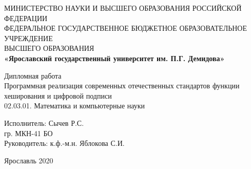 \begin{center}
	\large{МИНИСТЕРСТВО НАУКИ И ВЫСШЕГО ОБРАЗОВАНИЯ РОССИЙСКОЙ ФЕДЕРАЦИИ}\\
	\footnotesize{ФЕДЕРАЛЬНОЕ ГОСУДАРСТВЕННОЕ БЮДЖЕТНОЕ ОБРАЗОВАТЕЛЬНОЕ УЧРЕЖДЕНИЕ}\\ 
	\footnotesize{ВЫСШЕГО ОБРАЗОВАНИЯ}\\
	\small{\textbf{«Ярославский государственный университет им. П.Г. Демидова»}}\\
	\hfill \break
	\hfill\break
	\hfill \break
	\hfill \break
	\hfill \break
	\hfill \break
	\hfill \break
	\hfill \break
	\hfill \break
	\hfill \break
	
	\normalsize{Дипломная работа}\\
	\large{Программная реализация современных отечественных стандартов функции хеширования и цифровой подписи}\\	
	02.03.01. Математика и компьютерные науки\\
	
	\hfill \break
	\hfill \break
	\hfill \break
	\hfill \break
	\hfill \break
\end{center}

\normalsize{ 
	\begin{flushleft}
		\hspace*{80mm}Исполнитель: Сычев Р.С. \\
		\hspace*{80mm}гр. МКН-41 БО \\
		\hspace*{80mm}Руководитель: к.ф.-м.н. Яблокова С.И.
	\end{flushleft}
}
\hfill \break
\hfill \break
\hfill \break
\hfill \break
\hfill \break
\begin{center} Ярославль 2020 \end{center}
\thispagestyle{empty} %
